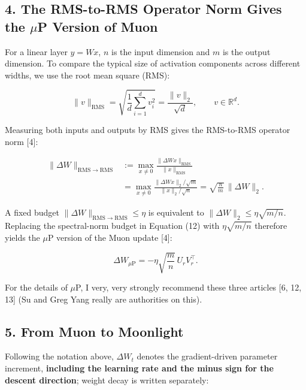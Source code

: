 \documentclass[
  english,
  10pt,
  a4paper,
]{article}
\begin{document}
\subsection{\texorpdfstring{4. The RMS-to-RMS Operator Norm Gives the
\(\mu\)P Version of
Muon}{4. The RMS-to-RMS Operator Norm Gives the \textbackslash muP Version of Muon}}\label{the-rms-to-rms-operator-norm-gives-the-mup-version-of-muon}

For a linear layer \(y=Wx\), \(n\) is the input dimension and \(m\) is
the output dimension. To compare the typical size of activation
components across different widths, we use the root mean square (RMS):

\nopagebreak[4]

\[
\|v\|_{\mathrm{RMS}}
=\sqrt{\frac{1}{d}\sum_{i=1}^d v_i^2}
=\frac{\|v\|_2}{\sqrt d},\qquad v\in\mathbb R^d.
\tag{13}
\]

Measuring both inputs and outputs by RMS gives the RMS-to-RMS operator
norm {[}4{]}:

\nopagebreak[4]

\[
\begin{aligned}
\|\Delta W\|_{\mathrm{RMS}\to\mathrm{RMS}}
&:=\max_{x\ne0}\frac{\|\Delta W x\|_{\mathrm{RMS}}}{\|x\|_{\mathrm{RMS}}}\\
&=\max_{x\ne0}\frac{\|\Delta W x\|_2/\sqrt m}{\|x\|_2/\sqrt n}
=\sqrt{\frac{n}{m}}\,\|\Delta W\|_2.
\end{aligned}
\tag{14}
\]

A fixed budget \(\|\Delta W\|_{\mathrm{RMS}\to\mathrm{RMS}}\leq\eta\) is
equivalent to \(\|\Delta W\|_2\leq\eta\sqrt{m/n}\). Replacing the
spectral-norm budget in Equation (12) with \(\eta\sqrt{m/n}\) therefore
yields the \(\mu\)P version of the Muon update {[}4{]}:

\nopagebreak[4]

\[
\boxed{\Delta W_{\mu\mathrm P}
=-\eta\sqrt{\frac{m}{n}}\,U_rV_r^\top.}
\tag{15}
\]

For the details of \(\mu\)P, I very, very strongly recommend these three
articles {[}6, 12, 13{]} (Su and Greg Yang really are authorities on
this).

\subsection{5. From Muon to Moonlight}\label{from-muon-to-moonlight}

Following the notation above, \(\Delta W_t\) denotes the gradient-driven
parameter increment, \textbf{including the learning rate and the minus
sign for the descent direction}; weight decay is written separately:
\end{document}
